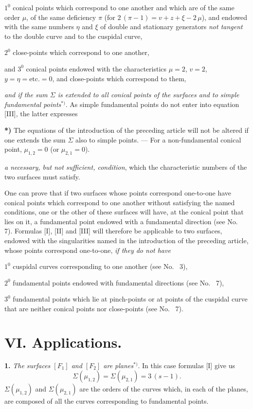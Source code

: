\documentclass{article}
\begin{document}
$1^0$ conical points which correspond to one another and which are of the same order $\mu$, of the same deficiency $\pi$ (for $2\,(\pi - 1) = v + z + \xi - 2\,\mu$), and endowed with the same numbers $\eta$ and $\xi$ of double and stationary generators \emph{not tangent} to the double curve and to the cuspidal curve,

$2^0$ close-points which correspond to one another,

and $3^0$ conical points endowed with the characteristics $\mu = 2$, $v = 2$, $y = \eta = \text{etc.} = 0$, and close-points which correspond to them,

\emph{and if the sum $\Sigma$ is extended to all conical points of the surfaces and to simple fundamental points}${}^{*)}$. As simple fundamental points do not enter into equation [III], the latter expresses

\textbf{*)} The equations of the introduction of the preceding article will not be altered if one extends the sum $\Sigma$ also to simple points. --- For a non-fundamental conical point, $\mu_{1, 2} = 0$ (or $\mu_{2, 1} = 0$).

\emph{a necessary, but not sufficient, condition}, which the characteristic numbers of the two surfaces must satisfy.

One can prove that if two surfaces whose points correspond one-to-one have conical points which correspond to one another without satisfying the named conditions, one or the other of these surfaces will have, at the conical point that lies on it, a fundamental point endowed with a fundamental direction (see No.~ 7). Formulas [I], [II] and [III] will therefore be applicable to two surfaces, endowed with the singularities named in the introduction of the preceding article, whose points correspond one-to-one, \emph{if they do not have}

$1^0$ cuspidal curves corresponding to one another (see No.~ 3),

$2^0$ fundamental points endowed with fundamental directions (see No.~ 7),

$3^0$ fundamental points which lie at pinch-points or at points of the cuspidal curve that are neither conical points nor close-points (see No.~ 7).

\section*{VI. Applications.}

\textbf{1.} \emph{The surfaces $[F_1]$ and $[F_2]$ are planes}${}^{*)}$. In this case formulas [I] give us
\[
\Sigma(\mu_{1, 2}) = \Sigma(\mu_{2, 1}) = 3\,(s - 1).
\]
$\Sigma(\mu_{1, 2})$ and $\Sigma(\mu_{2, 1})$ are the orders of the curves which, in each of the planes, are composed of all the curves corresponding to fundamental points.
\end{document}
